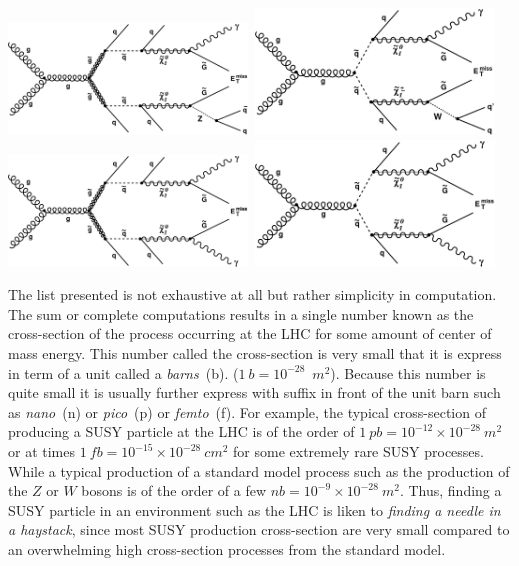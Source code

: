 {\begin{center}
\centering
\mbox{\includegraphics[width=2.5in]{THESISPLOTS/SinglePhoton_gluino.pdf} \quad \quad
\includegraphics[width=2.5in]{THESISPLOTS/SinglePhoton_squark.pdf}} \\
\hspace{0.5cm}
\mbox{\includegraphics[width=2.5in]{THESISPLOTS/Diphoton_gluino.pdf} \quad \quad
\includegraphics[width=2.5in]{THESISPLOTS/Diphoton_squark.pdf}}
\label{fig:feynman_gsDiag}
\end{center}

The list presented  is not exhaustive at all but rather simplicity in computation. The sum or complete computations results in a single number known as the cross-section of the process occurring at the LHC for some amount of center of mass energy. This number called the cross-section is very small that it is express in term of a unit called a \textit{barns}~(b). ($1~b = 10^{-28}$~$m^{2}$). Because this number is quite small it is usually further express with suffix in front of the unit barn such as \textit{nano}~(n) or \textit{pico}~(p) or \textit{femto}~(f). For example, the typical cross-section of producing a SUSY particle at the LHC is of the order of $1~pb =10^{-12}\times 10^{-28}~m^{2}$ or at times $1~fb = 10^{-15}\times 10^{-28}~cm^{2}$ for some extremely rare SUSY processes. While a typical production of a standard model process such as the production of the $Z$ or $W$ bosons is of the order of a few $nb = 10^{-9}\times 10^{-28}~m^{2}$. Thus, finding a SUSY particle in an environment such as the LHC is liken to \textit{finding a needle in a haystack}, since most SUSY production cross-section are very small compared to an overwhelming high cross-section processes from the standard model.

}
